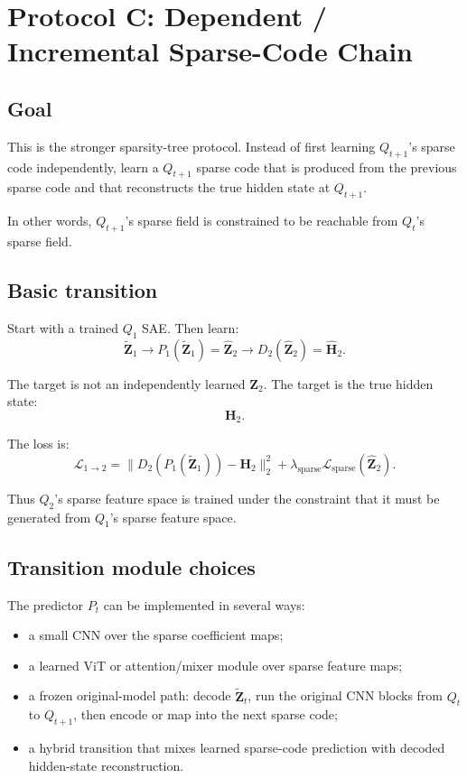 \documentclass[11pt]{article}
\newcommand{\Htens}{\mathbf{H}}
\newcommand{\Ztens}{\mathbf{Z}}
\newcommand{\Hhat}{\widehat{\mathbf{H}}}
\newcommand{\Zhat}{\widehat{\mathbf{Z}}}
\newcommand{\Ztilde}{\widetilde{\mathbf{Z}}}
\begin{document}
\section{Protocol C: Dependent / Incremental Sparse-Code Chain}

\subsection{Goal}

This is the stronger sparsity-tree protocol. Instead of first learning \(Q_{t+1}\)'s sparse code independently, learn a \(Q_{t+1}\) sparse code that is produced from the previous sparse code and that reconstructs the true hidden state at \(Q_{t+1}\).

In other words, \(Q_{t+1}\)'s sparse field is constrained to be reachable from \(Q_t\)'s sparse field.

\subsection{Basic transition}

Start with a trained \(Q_1\) SAE. Then learn:
\[
\Ztilde_1
\rightarrow
P_1(\Ztilde_1)=\Zhat_2
\rightarrow
D_2(\Zhat_2)=\Hhat_2.
\]

The target is not an independently learned \(\Ztens_2\). The target is the true hidden state:
\[
\Htens_2.
\]

The loss is:
\[
\mathcal{L}_{1\rightarrow 2}
=
\|D_2(P_1(\Ztilde_1))-\Htens_2\|_2^2
+
\lambda_{\mathrm{sparse}}\mathcal{L}_{\mathrm{sparse}}(\Zhat_2).
\]

Thus \(Q_2\)'s sparse feature space is trained under the constraint that it must be generated from \(Q_1\)'s sparse feature space.

\subsection{Transition module choices}

The predictor \(P_t\) can be implemented in several ways:

\begin{itemize}[leftmargin=*]
    \item a small CNN over the sparse coefficient maps;
    \item a learned ViT or attention/mixer module over sparse feature maps;
    \item a frozen original-model path: decode \(\Ztilde_t\), run the original CNN blocks from \(Q_t\) to \(Q_{t+1}\), then encode or map into the next sparse code;
    \item a hybrid transition that mixes learned sparse-code prediction with decoded hidden-state reconstruction.
\end{itemize}
\end{document}
